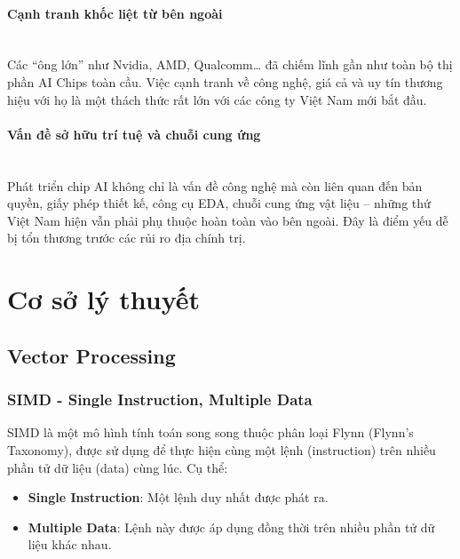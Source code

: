 \documentclass[a4paper]{article}
\begin{document}
\paragraph{Cạnh tranh khốc liệt từ bên ngoài}\leavevmode\\
Các “ông lớn” như Nvidia, AMD, Qualcomm… đã chiếm lĩnh gần như toàn bộ thị phần AI Chips toàn cầu. Việc cạnh tranh về công nghệ, giá cả và uy tín thương hiệu với họ là một thách thức rất lớn với các công ty Việt Nam mới bắt đầu.
\paragraph{Vấn đề sở hữu trí tuệ và chuỗi cung ứng}\leavevmode\\
Phát triển chip AI không chỉ là vấn đề công nghệ mà còn liên quan đến bản quyền, giấy phép thiết kế, công cụ EDA, chuỗi cung ứng vật liệu – những thứ Việt Nam hiện vẫn phải phụ thuộc hoàn toàn vào bên ngoài. Đây là điểm yếu dễ bị tổn thương trước các rủi ro địa chính trị.
\section{Cơ sở lý thuyết}
\subsection{Vector Processing}
\subsubsection{SIMD - Single Instruction, Multiple Data}
SIMD là một mô hình tính toán song song thuộc phân loại Flynn (Flynn's Taxonomy), được sử dụng để thực hiện cùng một lệnh (instruction) trên nhiều phần tử dữ liệu (data) cùng lúc. Cụ thể:
\begin{itemize}
\item \textbf{Single Instruction}: Một lệnh duy nhất được phát ra.
\item \textbf{Multiple Data}: Lệnh này được áp dụng đồng thời trên nhiều phần tử dữ liệu khác nhau.
\end{itemize}
 
\end{document}
